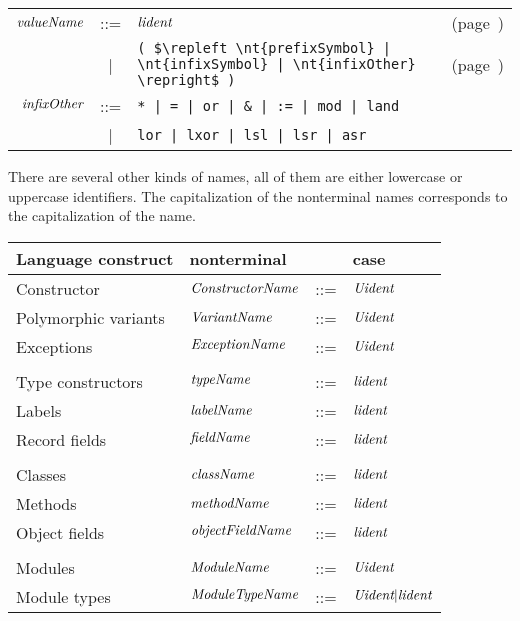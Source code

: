 \begin{center}
\begin{tabular}{rcll}
$\textit{\rmfamily valueName}$ & ::= & $\textit{\rmfamily lident}$ & (page~\pageref{keyword:let})\\
& | & \hbox{\lstinline/( $\repleft \nt{prefixSymbol} | \nt{infixSymbol} | \nt{infixOther} \repright$ )/} & (page~\pageref{name:value-name})\\
$\textit{\rmfamily infixOther}$ & ::= & \hbox{\lstinline/* | = | or | & | := | mod | land/}\\
& | & \hbox{\lstinline/lor | lxor | lsl | lsr | asr/}\\
\end{tabular}
\end{center}
%
There are several other kinds of names, all of them are either lowercase or uppercase identifiers.
The capitalization of the nonterminal names corresponds to the capitalization of the name.

\begin{center}
\begin{tabular}{llcl}
Language construct & nonterminal & & case\\
\hline
Constructor          & $\textit{\rmfamily ConstructorName}$ & ::= & $\textit{\rmfamily Uident}$\\
Polymorphic variants & $\textit{\rmfamily VariantName}$ & ::= & $\textit{\rmfamily Uident}$\\
Exceptions           & $\textit{\rmfamily ExceptionName}$ & ::= & $\textit{\rmfamily Uident}$\\
\\
Type constructors    & $\textit{\rmfamily typeName}$ & ::= & $\textit{\rmfamily lident}$\\
Labels               & $\textit{\rmfamily labelName}$ & ::= & $\textit{\rmfamily lident}$\\
Record fields        & $\textit{\rmfamily fieldName}$ & ::= & $\textit{\rmfamily lident}$\\
\\
Classes              & $\textit{\rmfamily className}$ & ::= & $\textit{\rmfamily lident}$\\
Methods              & $\textit{\rmfamily methodName}$ & ::= & $\textit{\rmfamily lident}$\\
Object fields        & $\textit{\rmfamily objectFieldName}$ & ::= & $\textit{\rmfamily lident}$\\
\\
Modules              & $\textit{\rmfamily ModuleName}$ & ::= & $\textit{\rmfamily Uident}$\\
Module types         & $\textit{\rmfamily ModuleTypeName}$ & ::= & $\textit{\rmfamily Uident} | \textit{\rmfamily lident}$\\
\end{tabular}
\end{center}

